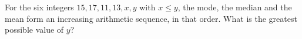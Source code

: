 For the six integers $15,17,11,13,x,y$ with $x\le y$, the mode, the median and the mean form an increasing arithmetic sequence, in that order. What is the greatest possible value of $y$?

